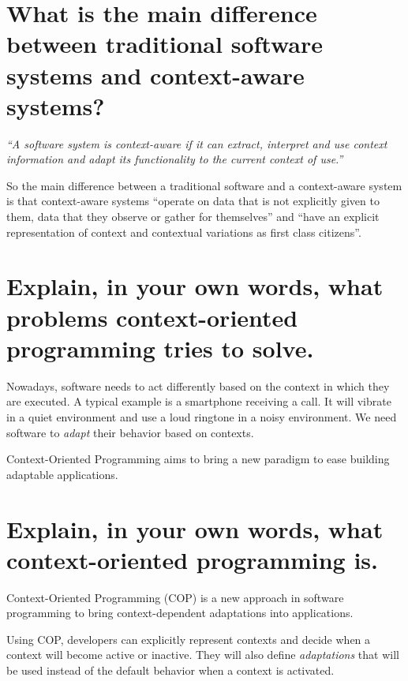 \section{What is the main difference between traditional software systems and context-aware
systems?}

\emph{\enquote{A software system is context-aware
if it can extract, interpret and use context information
and adapt its functionality to the current context of use.}} \quad

So the main difference between a traditional software and a context-aware system is that context-aware systems ``operate on data that is not explicitly given to them, data that they observe or gather for themselves'' and ``have an explicit representation of context and contextual variations as first class citizens''.

\section{Explain, in your own words, what problems context-oriented programming tries to solve.}

Nowadays, software needs to act differently based on the context in which they are executed.
A typical example is a smartphone receiving a call. It will vibrate in a quiet environment and use a loud ringtone in a noisy environment.
We need software to \textit{adapt} their behavior based on contexts.

Context-Oriented Programming aims to bring a new paradigm to ease building adaptable applications.


\section{Explain, in your own words, what context-oriented programming is.}

Context-Oriented Programming (COP) is a new approach in software programming to bring context-dependent adaptations into applications.

Using COP, developers can explicitly represent contexts and decide when a context will become active or inactive. They will also define \textit{adaptations} that will be used instead of the default behavior when a context is activated.


